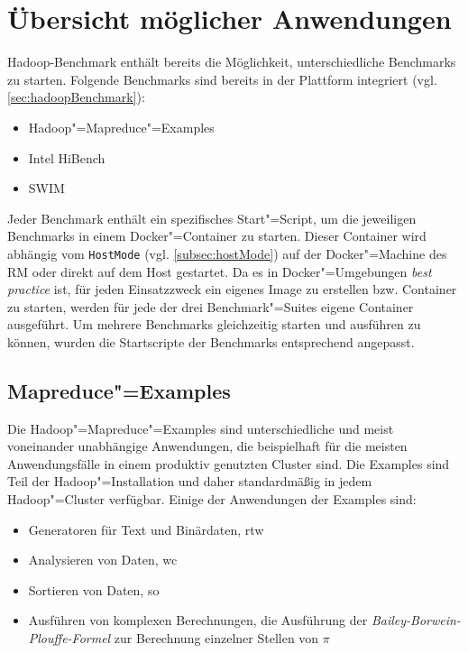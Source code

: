 \section{Übersicht möglicher Anwendungen}
\label{sec:appOverview}

Hadoop-Benchmark enthält bereits die Möglichkeit, unterschiedliche Benchmarks zu starten.
Folgende Benchmarks sind bereits in der Plattform integriert (vgl. \cref{sec:hadoopBenchmark}):

\begin{itemize}
    \item Hadoop"=Mapreduce"=Examples
    \item Intel HiBench
    \item \gls{SWIM}
\end{itemize}

Jeder Benchmark enthält ein spezifisches Start"=Script, um die jeweiligen Benchmarks in einem Docker"=Container zu starten.
Dieser Container wird abhängig vom \texttt{HostMode} (vgl. \cref{subsec:hostMode}) auf der Docker"=Machine des \gls{RM} oder direkt auf dem Host gestartet.
Da es in Docker"=Umgebungen \emph{best practice} ist, für jeden Einsatzzweck ein eigenes Image zu erstellen bzw. Container zu starten, werden für jede der drei Benchmark"=Suites eigene Container ausgeführt.
Um mehrere Benchmarks gleichzeitig starten und ausführen zu können, wurden die Startscripte der Benchmarks entsprechend angepasst.

\subsection{Mapreduce"=Examples}
\label{subsec:mapreduceExamples}

Die Hadoop"=Mapreduce"=Examples sind unterschiedliche und meist voneinander unabhängige Anwendungen, die beispielhaft für die meisten Anwendungsfälle in einem produktiv genutzten Cluster sind.
Die Examples sind Teil der Hadoop"=Installation und daher standardmäßig in jedem Hadoop"=Cluster verfügbar.
Einige der Anwendungen der Examples sind:

\begin{itemize}
    \item Generatoren für Text und Binärdaten, \zB \acrlong{rtw}
    \item Analysieren von Daten, \zB \acrlong{wc}
    \item Sortieren von Daten, \zB \acrlong{so}
    \item Ausführen von komplexen Berechnungen, \zB die Ausführung der \emph{Bailey-Borwein-Plouffe-Formel} \cite{Bailey1997} zur Berechnung einzelner Stellen von $\pi$
\end{itemize}

